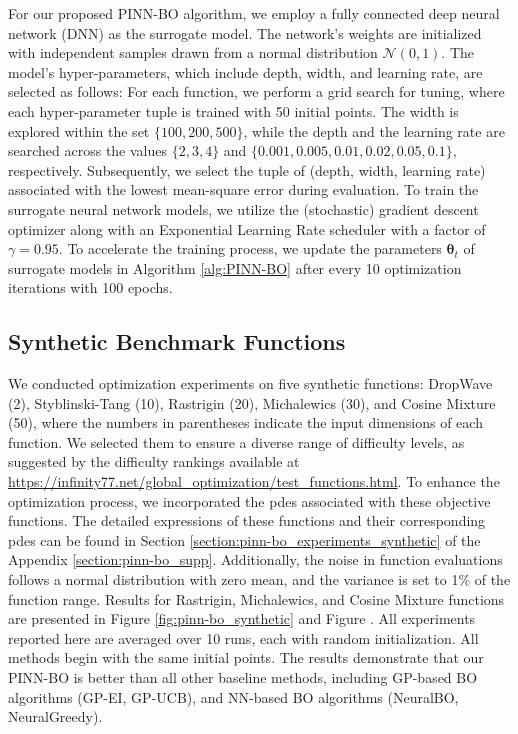 For our proposed PINN-BO algorithm, we employ a fully connected deep neural network (DNN) as the surrogate model. The network's weights are initialized with independent samples drawn from a normal distribution $\mathcal{N} (0, 1)$. The model's hyper-parameters, which include depth, width, and learning rate, are selected as follows: For each function, we perform a grid search for tuning, where each hyper-parameter tuple is trained with 50 initial points. The width is explored within the set $\{100,200,500\}$, while the depth and the learning rate are searched across the values $\{2,3,4\}$ and $\{0.001, 0.005, 0.01, 0.02, 0.05, 0.1\}$, respectively.  Subsequently, we select the tuple of (depth, width, learning rate) associated with the lowest mean-square error during evaluation. To train the surrogate neural network models, we utilize the (stochastic) gradient descent optimizer along with an Exponential Learning Rate scheduler with a factor of $\gamma=0.95$. To accelerate the training process, we update the parameters $\boldsymbol{\theta}_t$ of surrogate models in Algorithm \ref{alg:PINN-BO} after every 10 optimization iterations with 100 epochs.  

\subsection{Synthetic Benchmark Functions}
 We conducted optimization experiments on five synthetic functions: DropWave (2), Styblinski-Tang (10), Rastrigin (20), Michalewics (30), and Cosine Mixture (50), where the numbers in parentheses indicate the input dimensions of each function. We selected them to ensure a diverse range of difficulty levels, as suggested by the difficulty rankings available at \url{https://infinity77.net/global_optimization/test_functions.html}. To enhance the optimization process, we incorporated the \acp{pde} associated with these objective functions. The detailed expressions of these functions and their corresponding \acp{pde} can be found in  Section \ref{section:pinn-bo_experiments_synthetic}  of the  Appendix \ref{section:pinn-bo_supp}. Additionally, the noise in function evaluations follows a normal distribution with zero mean, and the variance is set to 1\% of the function range. Results for Rastrigin, Michalewics, and Cosine Mixture functions are presented in Figure \ref{fig:pinn-bo_synthetic} and Figure .
All experiments reported here are averaged over 10 runs, each with random initialization. All methods begin with the same initial points. The results demonstrate that our PINN-BO is better than all other baseline methods, including GP-based BO algorithms (GP-EI, GP-UCB), and NN-based BO algorithms (NeuralBO, NeuralGreedy). 


